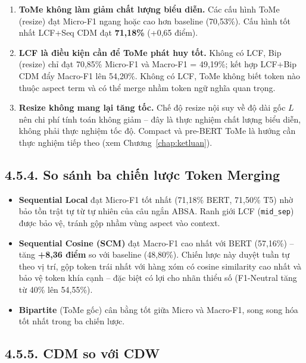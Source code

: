\begin{enumerate}
  \item \textbf{ToMe không làm giảm chất lượng biểu diễn.}
        Các cấu hình ToMe (resize) đạt Micro-F1 ngang hoặc cao hơn
        baseline (70,53\%). Cấu hình tốt nhất LCF+Seq CDM đạt
        \textbf{71,18\%} (+0,65 điểm).

  \item \textbf{LCF là điều kiện cần để ToMe phát huy tốt.}
        Không có LCF, Bip (resize) chỉ đạt 70,85\% Micro-F1 và Macro-F1
        = 49,19\%; kết hợp LCF+Bip CDM đẩy Macro-F1 lên 54,20\%.
        Không có LCF, ToMe không biết token nào thuộc aspect term và có
        thể merge nhầm token ngữ nghĩa quan trọng.

  \item \textbf{Resize không mang lại tăng tốc.}
        Chế độ resize nội suy về độ dài gốc $L$ nên chi phí tính toán
        không giảm -- đây là thực nghiệm chất lượng biểu diễn, không
        phải thực nghiệm tốc độ. Compact và pre-BERT ToMe là hướng cần
        thực nghiệm tiếp theo (xem Chương~\ref{chap:ketluan}).
\end{enumerate}

\subsection{4.5.4.\; So sánh ba chiến lược Token Merging}

\begin{itemize}
  \item \textbf{Sequential Local} đạt Micro-F1 tốt nhất (71,18\% BERT,
        71,50\% T5) nhờ bảo tồn trật tự từ tự nhiên của câu ngắn ABSA.
        Ranh giới LCF (\texttt{mid\_sep}) được bảo vệ, tránh gộp nhầm
        vùng aspect vào context.

  \item \textbf{Sequential Cosine (SCM)} đạt Macro-F1 cao nhất với BERT
        (57,16\%) -- tăng \textbf{+8,36 điểm} so với baseline (48,80\%).
        Chiến lược này duyệt tuần tự theo vị trí, gộp token trái nhất với
        hàng xóm có cosine similarity cao nhất và bảo vệ token khía cạnh
        -- đặc biệt có lợi cho nhãn thiểu số (F1-Neutral tăng từ 40\% lên
        54,55\%).

  \item \textbf{Bipartite} (ToMe gốc) cân bằng tốt giữa Micro và
        Macro-F1, song song hóa tốt nhất trong ba chiến lược.
\end{itemize}

\subsection{4.5.5.\; CDM so với CDW}

